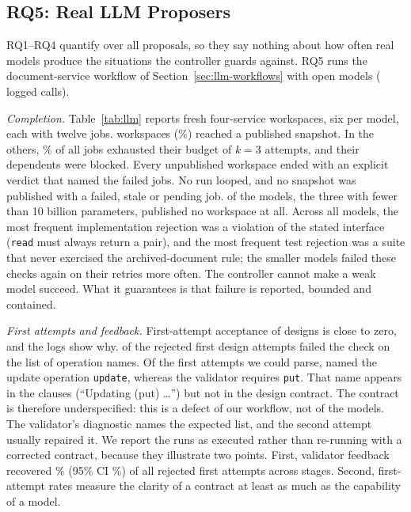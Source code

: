 \subsection{RQ5: Real LLM Proposers}\label{sec:rq5}
RQ1--RQ4 quantify over all proposals, so they say nothing about how often real models produce the situations the controller guards against. RQ5 runs the document-service workflow of Section~\ref{sec:llm-workflows} with \LlmModelsN{} open models (\LlmCallsTotal{} logged calls).



\emph{Completion.} Table~\ref{tab:llm} reports \LlmTrials{} fresh four-service workspaces, six per model, each with twelve jobs. \LlmPublished{} workspaces (\LlmPublishedPct\%) reached a published snapshot. In the others, \LlmJobsFailedPct\% of all jobs exhausted their budget of $k=3$ attempts, and their dependents were blocked. Every unpublished workspace ended with an explicit verdict that named the failed jobs. No run looped, and no snapshot was published with a failed, stale or pending job. \LlmModelsNeverPublished{} of the \LlmModelsN{} models, the three with fewer than 10 billion parameters, published no workspace at all. Across all models, the most frequent implementation rejection was a violation of the stated interface (\texttt{read} must always return a pair), and the most frequent test rejection was a suite that never exercised the archived-document rule; the smaller models failed these checks again on their retries more often. The controller cannot make a weak model succeed. What it guarantees is that failure is reported, bounded and contained.

\emph{First attempts and feedback.} First-attempt acceptance of designs is close to zero, and the logs show why. \LlmDesignNameRejects{} of the \LlmDesignFirstRejects{} rejected first design attempts failed the check on the list of operation names. Of the \LlmDesignParsed{} first attempts we could parse, \LlmDesignUpdateNamed{} named the update operation \texttt{update}, whereas the validator requires \texttt{put}. That name appears in the clauses (``Updating (put) \dots'') but not in the design contract. The contract is therefore underspecified: this is a defect of our workflow, not of the models. The validator's diagnostic names the expected list, and the second attempt usually repaired it. We report the runs as executed rather than re-running with a corrected contract, because they illustrate two points. First, validator feedback recovered \LlmFeedbackRecoveredPct\% (95\% CI \LlmFeedbackRecoveredCI\%) of all rejected first attempts across stages. Second, first-attempt rates measure the clarity of a contract at least as much as the capability of a model.

